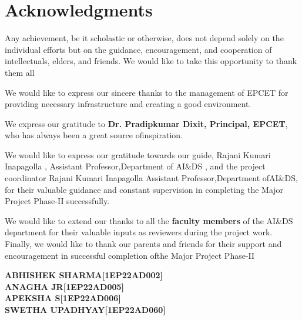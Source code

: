 \documentclass[a4paper, 12pt]{report}
\begin{document}
\setlength{\parindent}{0pt}


\chapter*{Acknowledgments}
\thispagestyle{borderedpage}
\vspace{1.0cm}
Any achievement, be it scholastic or otherwise, does not depend solely on the individual efforts but on the guidance, encouragement, and cooperation of intellectuals, elders, and friends. We would like to take this opportunity to thank them all
\vspace{0.2cm}

We would like to express our sincere thanks to the management of EPCET for providing necessary infrastructure and creating a good environment.
\vspace{0.2cm}

We express our gratitude to \textbf{Dr. Pradipkumar Dixit, Principal, EPCET}, who has always been a great source ofinspiration.
\vspace{0.2cm}

We would like to express our gratitude towards our guide, Rajani Kumari Inapagolla , Assistant Professor,Department of AI\&DS , and the project coordinator Rajani Kumari Inapagolla Assistant Professor,Department ofAI\&DS, for their valuable guidance and constant supervision in completing the Major Project Phase-II successfully.
\vspace{0.2cm}

We would like to extend our thanks to all the \textbf{faculty members} of the AI\&DS department for their valuable inputs as reviewers during the project work.
Finally, we would like to thank our parents and friends for their support and encouragement in successful completion ofthe Major Project Phase-II
\vspace{0.2cm}

\vspace{0.2cm}

\begin{flushright}
    \textbf{ABHISHEK SHARMA[1EP22AD002]}\\
    \textbf{ANAGHA JR[1EP22AD005]}\\
    \textbf{APEKSHA S[1EP22AD006]}\\
    \textbf{SWETHA UPADHYAY[1EP22AD060]}\\
\end{flushright}
\end{document}
